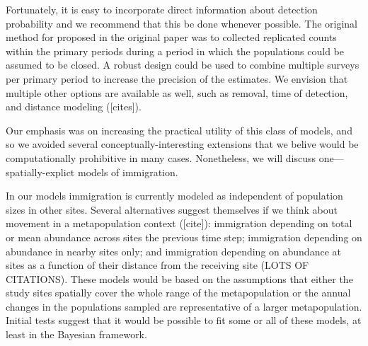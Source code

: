 \documentclass[12pt]{article}
\begin{document}
Fortunately, it is easy to incorporate direct information about
detection probability and we recommend that this be done whenever
possible. The original method for proposed in the original paper was
to collected replicated counts within the primary periods during a
period in which the populations could be assumed to be closed.  A
robust design could be used to combine multiple surveys per primary
period to increase the precision of the estimates. We envision that
multiple other options are available as well, such as removal, time of
detection, and distance modeling ([cites]).

Our emphasis was on increasing the practical utility of this class of
models, and so we avoided several conceptually-interesting extensions
that we belive would be computationally prohibitive in many
cases. Nonetheless, we will discuss one---spatially-explict models of
immigration.

In our models immigration is currently modeled as independent of
population sizes in other sites. Several alternatives suggest
themselves if we think about movement in a metapopulation
context ([cite]): immigration depending on total or mean
abundance across sites the previous time step; immigration
depending on abundance in nearby sites only; and immigration
depending on abundance at sites as a function of their distance
from the receiving site (LOTS OF CITATIONS). These models would
be based on the assumptions that either the study sites
spatially cover the whole range of the metapopulation or the
annual changes in the populations sampled are representative of
a larger metapopulation. Initial tests suggest that it would be
possible to fit some or all of these models, at least in the
Bayesian framework.
\end{document}
